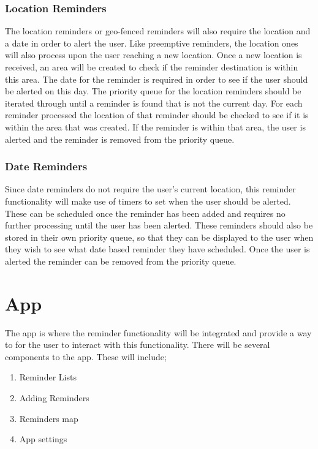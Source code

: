 \documentclass[12pt]{report}
\begin{document}
\subsubsection{Location Reminders}

The location reminders or geo-fenced reminders will also require the location and a date in order to alert the user. Like preemptive reminders, the location ones will also process upon the user reaching a new location. Once a new location is received, an area will be created to check if the reminder destination is within this area. The date for the reminder is required in order to see if the user should be alerted on this day. The priority queue for the location reminders should be iterated through until a reminder is found that is not the current day. For each reminder processed the location of that reminder should be checked to see if it is within the area that was created. If the reminder is within that area, the user is alerted and the reminder is removed from the priority queue.

\subsubsection{Date Reminders}

Since date reminders do not require the user's current location, this reminder functionality will make use of timers to set when the user should be alerted. These can be scheduled once the reminder has been added and requires no further processing until the user has been alerted. These reminders should also be stored in their own priority queue, so that they can be displayed to the user when they wish to see what date based reminder they have scheduled. Once the user is alerted the reminder can be removed from the priority queue.

\section{App}

The app is where the reminder functionality will be integrated and provide a way to for the user to interact with this functionality. There will be several components to the app. These will include;

\begin{enumerate}[label*=\arabic*.]

\item{Reminder Lists}
\item{Adding Reminders}
\item{Reminders map}
\item{App settings}
    
\end{enumerate}
\end{document}
